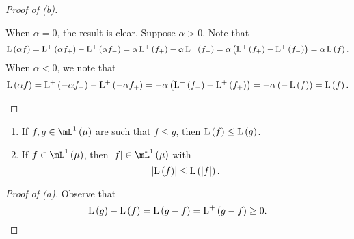 \documentclass[pmath450]{subfiles}
\begin{document}
\begin{proof}[Proof of (b)]
\begin{itemize}
                \begin{subproof}
                    When $\alpha=0$, the result is clear. Suppose $\alpha>0$. Note that
                    \begin{equation*}
                        \operatorname{L}\left( \alpha f \right) = \operatorname{L^+}\left( \alpha f_+ \right) - \operatorname{L^+}\left( \alpha f_- \right) = \alpha\operatorname{L^+}\left( f_+ \right) - \alpha\operatorname{L^+}\left( f_- \right) = \alpha\left( \operatorname{L^+}\left( f_+ \right)-\operatorname{L^+}\left( f_- \right) \right) = \alpha\operatorname{L}\left( f \right).
                    \end{equation*}
                    When $\alpha<0$, we note that
                    \begin{equation*}
                        \operatorname{L}\left( \alpha f \right) = \operatorname{L^+}\left( -\alpha f_- \right) - \operatorname{L^+}\left( -\alpha f_+ \right) = -\alpha\left( \operatorname{L^+}\left( f_- \right)-\operatorname{L^+}\left( f_+ \right) \right) = -\alpha\left( -\operatorname{L}\left( f \right) \right) = \operatorname{L}\left( f \right).
                    \end{equation*}
                \end{subproof}
        \end{itemize} 
    \end{proof}

    \begin{prop}{}
        \vspace{-11pt}
        \begin{enumerate}
            \item If $f,g\in\mL^{1}\left( \mu \right)$ are such that $f\leq g$, then $\operatorname{L}\left( f \right)\leq\operatorname{L}\left( g \right)$.
            \item If $f\in\mL^{1}\left( \mu \right)$, then $\left| f \right|\in\mL^{1}\left( \mu \right)$ with
                \begin{equation*}
                    \left| \operatorname{L}\left( f \right) \right| \leq \operatorname{L}\left( \left| f \right| \right).
                \end{equation*}
        \end{enumerate}
    \end{prop}

    \begin{proof}[Proof of (a)]
        Observe that
        \begin{equation*}
            \operatorname{L}\left( g \right)-\operatorname{L}\left( f \right) = \operatorname{L}\left( g-f \right) = \operatorname{L^+}\left( g-f \right) \geq 0.
        \end{equation*}
        \qedplacedtrue
    \end{proof}
\end{document}
